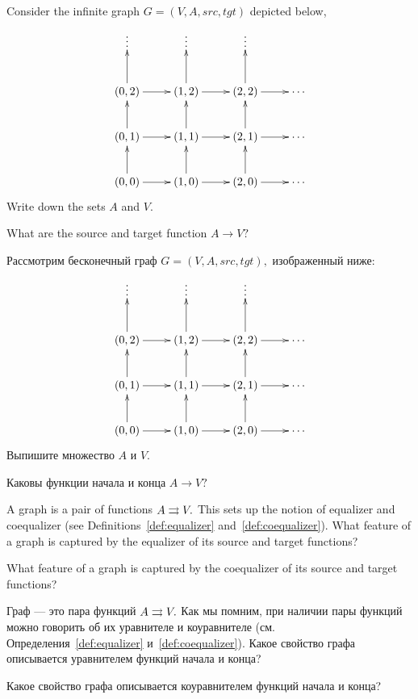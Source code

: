 \documentclass[../main/CT4S-EN-RU]{subfiles}
\begin{document}
\begin{exerciseENG}\label{exc:lattice}
Consider the infinite graph $G=(V,A,src,tgt)$ depicted below,
$$
\xymatrix{
\vdots&\vdots&\vdots\\
(0,2)\ar[r]\ar[u]&(1,2)\ar[r]\ar[u]&(2,2)\ar[r]\ar[u]&\cdots\\
(0,1)\ar[r]\ar[u]&(1,1)\ar[r]\ar[u]&(2,1)\ar[r]\ar[u]&\cdots\\
(0,0)\ar[r]\ar[u]&(1,0)\ar[r]\ar[u]&(2,0)\ar[r]\ar[u]&\cdots}
$$
\sexc Write down the sets $A$ and $V.$ 
\item What are the source and target function $A\to V?$  
\endsexc
\end{exerciseENG}

\begin{exerciseRUS}\label{exc:lattice}
Рассмотрим бесконечный граф $G=(V,A,src,tgt),$ изображенный ниже:
$$\xymatrix{
    \vdots  &  \vdots  &  \vdots  \\
    (0,2) \ar[r] \ar[u]  &  (1,2) \ar[r] \ar[u]  &  (2,2) \ar[r] \ar[u]  &  \cdots\\
    (0,1) \ar[r] \ar[u]  &  (1,1) \ar[r] \ar[u]  &  (2,1) \ar[r] \ar[u]  &  \cdots\\
    (0,0) \ar[r] \ar[u]  &  (1,0) \ar[r] \ar[u]  &  (2,0) \ar[r] \ar[u]  &  \cdots
}$$
\sexc Выпишите множество $A$ и $V.$ 
\item Каковы функции начала и конца $A\to V?$  
\endsexc
\end{exerciseRUS}

\begin{exerciseENG}\label{exc:(co)equalizer of graph}
A graph is a pair of functions $A\rightrightarrows V.$ This sets up the notion of equalizer and coequalizer (see Definitions~\ref{def:equalizer} and~\ref{def:coequalizer}). 
\sexc What feature of a graph is captured by the equalizer of its source and target functions? 
\item What feature of a graph is captured by the coequalizer of its source and target functions?
\endsexc
\end{exerciseENG}

\begin{exerciseRUS}\label{exc:(co)equalizer of graph}
Граф — это пара функций $A\rightrightarrows V.$ Как мы помним, при наличии пары функций можно говорить об их уравнителе и коуравнителе (см. Определения~\ref{def:equalizer} и~\ref{def:coequalizer}). 
\sexc Какое свойство графа описывается уравнителем функций начала и конца? 
\item Какое свойство графа описывается коуравнителем функций начала и конца? 
\endsexc
\end{exerciseRUS}
\end{document}
